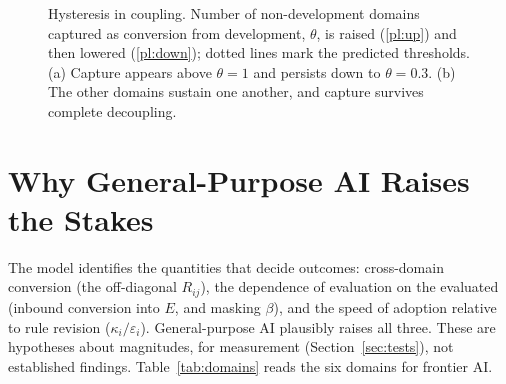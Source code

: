 \documentclass[letterpaper]{article} %
\theoremstyle{definition}
\begin{document}
\begin{figure}[t]
\centering

\caption{Hysteresis in coupling. Number of non-development domains captured as conversion from development, $\theta$, is raised (\ref{pl:up}) and then lowered (\ref{pl:down}); dotted lines mark the predicted thresholds. (a) Capture appears above $\theta=1$ and persists down to $\theta=0.3$. (b) The other domains sustain one another, and capture survives complete decoupling.}
\label{fig:hyst}
\end{figure}

\section{Why General-Purpose AI Raises the Stakes}\label{sec:ai}

The model identifies the quantities that decide outcomes: cross-domain conversion (the off-diagonal $R_{ij}$), the dependence of evaluation on the evaluated (inbound conversion into $E$, and masking $\beta$), and the speed of adoption relative to rule revision ($\kappa_i/\varepsilon_i$). General-purpose AI plausibly raises all three. These are hypotheses about magnitudes, for measurement (Section~\ref{sec:tests}), not established findings. Table~\ref{tab:domains} reads the six domains for frontier AI.
\end{document}
